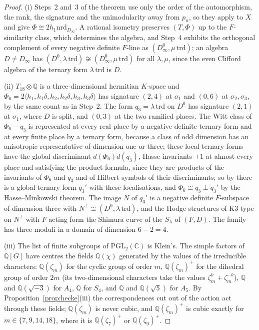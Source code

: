 \documentclass[11pt,reqno]{amsart}
\numberwithin{equation}{section}
\theoremstyle{plain}
\theoremstyle{definition}
\newcommand{\QQ}{\mathbb{Q}}
\newcommand{\CC}{\mathbb{C}}
\begin{document}
\begin{proof}
(i) Steps~2 and~3 of the theorem use only the order of the automorphism, the rank, the signature and the unimodularity away from $p_{n}$, so they apply to $X$ and give $\Phi\cong2h_{1}\mathrm{nrd}_{D_{\infty}}$. A rational isometry preserves $(T,\Phi)$ up to the $F$-similarity class, which determines the algebra, and Step~4 exhibits the orthogonal complement of every negative definite $F$-line as $(D_{\infty}^{0},\mu\,\mathrm{trd})$; an algebra $D\ne D_{\infty}$ has $(D^{0},\lambda\,\mathrm{trd})\not\cong(D_{\infty}^{0},\mu\,\mathrm{trd})$ for all $\lambda,\mu$, since the even Clifford algebra of the ternary form $\lambda\,\mathrm{trd}$ is $D$.

(ii) $T_{18}\otimes\QQ$ is a three-dimensional hermitian $K$-space and $\Phi_{6}=2\langle h_{1},h_{1}\delta,h_{2},h_{2}\delta,h_{3},h_{3}\delta\rangle$ has signature $(2,4)$ at $\sigma_{1}$ and $(0,6)$ at $\sigma_{2},\sigma_{3}$, by the same count as in Step~2. The form $q_{3}=\lambda\,\mathrm{trd}$ on $D^{0}$ has signature $(2,1)$ at $\sigma_{1}$, where $D$ is split, and $(0,3)$ at the two ramified places. The Witt class of $\Phi_{6}-q_{3}$ is represented at every real place by a negative definite ternary form and at every finite place by a ternary form, because a class of odd dimension has an anisotropic representative of dimension one or three; these local ternary forms have the global discriminant $d(\Phi_{6})d(q_{3})$, Hasse invariants $+1$ at almost every place and satisfying the product formula, since they are products of the invariants of $\Phi_{6}$ and $q_{3}$ and of Hilbert symbols of their discriminants; so by \cite[Thm.~72:1]{OMe00} there is a global ternary form $q_{3}'$ with these localisations, and $\Phi_{6}\cong q_{3}\perp q_{3}'$ by the Hasse--Minkowski theorem. The image $N$ of $q_{3}'$ is a negative definite $F$-subspace of dimension three with $N^{\perp}\cong(D^{0},\lambda\,\mathrm{trd})$, and the Hodge structures of K3 type on $N^{\perp}$ with $F$ acting form the Shimura curve of the $S_{\lambda}$ of $(F,D)$. The family has three moduli \cite[\S5.4]{vGS25} in a domain of dimension $6-2=4$.

(iii) The list of finite subgroups of $\mathrm{PGL}_{2}(\CC)$ is Klein's. The simple factors of $\QQ[G]$ have centres the fields $\QQ(\chi)$ generated by the values of the irreducible characters: $\QQ(\zeta_{m})$ for the cyclic group of order $m$, $\QQ(\zeta_{m})^{+}$ for the dihedral group of order $2m$ (its two-dimensional characters take the values $\zeta_{m}^{k}+\zeta_{m}^{-k}$), $\QQ$ and $\QQ(\sqrt{-3})$ for $A_{4}$, $\QQ$ for $S_{4}$, and $\QQ$ and $\QQ(\sqrt5)$ for $A_{5}$. By Proposition~\ref{prop:hecke}(iii) the correspondences cut out of the action act through these fields; $\QQ(\zeta_{m})$ is never cubic, and $\QQ(\zeta_{m})^{+}$ is cubic exactly for $m\in\{7,9,14,18\}$, where it is $\QQ(\zeta_{7})^{+}$ or $\QQ(\zeta_{9})^{+}$.
\end{proof}
\end{document}

